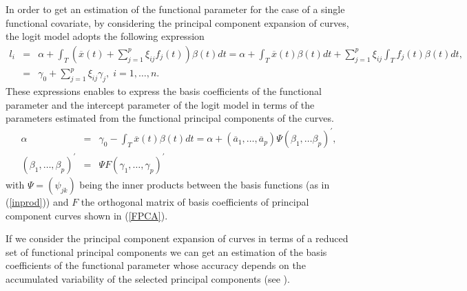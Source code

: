 In order to get an estimation of the functional parameter for the case of a single functional covariate, by considering the principal component expansion of curves, the logit model adopts the following expression
\begin{eqnarray*}
l_{i}&=&\alpha +\int_{T} \left(\overline{x}(t) + \sum_{j=1}^{p }\xi _{ij}f_{j}\left( t\right) \right)  \beta \left( t\right)dt
=\alpha
+\int_{T} \overline{x}(t) \beta \left( t\right)dt + \sum_{j=1}^{p }\xi _{ij} \int_{T} f_{j}\left( t\right) \beta \left( t\right)dt, \\
&=&\gamma_0+\sum_{j=1}^{p }\xi _{ij} \gamma_j,\;i=1,\ldots ,n.
\end{eqnarray*}
These expressions enables to express the basis coefficients of the functional parameter and the intercept parameter of the logit model in terms of the parameters estimated from the functional principal components of the curves.
\begin{eqnarray}
\alpha &=& \gamma_0 - \int_{T} \overline{x}(t) \beta \left( t\right)dt = \alpha +(\overline{a}_1,\ldots,\overline{a}_p) \Psi (\beta_1,\ldots\beta_p)^{\prime}, \label{Intercept} \\
(\beta_1,\ldots,\beta_p)^{\prime} &=& \Psi F (\gamma_1,\ldots, \gamma_p)^{\prime}
\label{pclogitfun}
\end{eqnarray}
with $\Psi=\left(\psi _{jk}\right)$ being the inner products between the basis functions (as in (\ref{inprod})) and $F$ the orthogonal matrix of basis coefficients of principal component curves shown in (\ref{FPCA}).

If we consider the principal component expansion of curves in terms of a reduced set of functional principal components we can get an estimation of the basis coefficients of the functional parameter whose accuracy depends on the accumulated variability of the selected principal components (see \citealp{Escabias04}).

